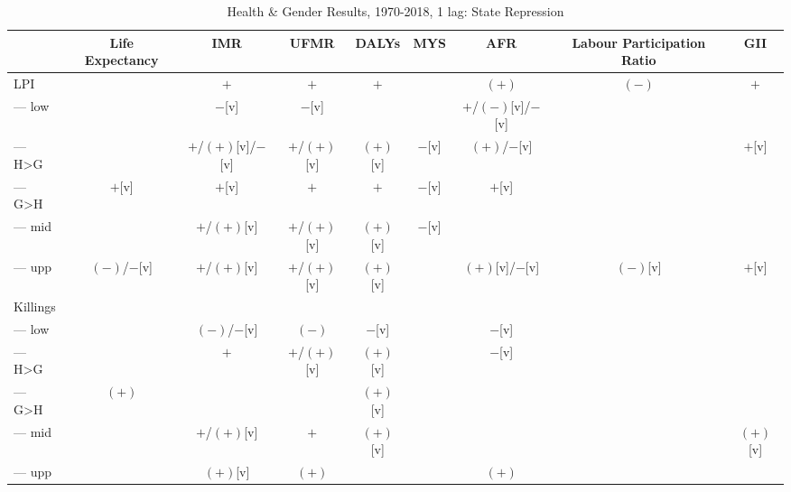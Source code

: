 \documentclass[12pt]{article}
\begin{document}
\begin{table}
\small
\centering
\caption{Health \& Gender Results, 1970-2018, 1 lag: State Repression}
\label{table_summary}
\begin{tabular}{lcccccccc}
\toprule
                          & Life Expectancy     & IMR                 & UFMR         & DALYs           & MYS      & AFR                           & Labour Participation Ratio     & GII \\
\midrule
LPI                       &                     & $+$                 & $+$          & $+$             &          & $(+)$                         & $(-)$                          & $+$ \\
--- low                   &                     & $-$[v]              & $-$[v]       &                 &          & $+$/$(-)$[v]/$-$[v]           &                                & \\
--- H>G                   &                     & $+$/$(+)$[v]/$-$[v] & $+$/$(+)$[v] & $(+)$[v]        & $-$[v]   & $(+)$/$-$[v]                  &                                & $+$[v] \\
--- G>H                   & $+$[v]              & $+$[v]              & $+$          & $+$             & $-$[v]   & $+$[v]                        &                                & \\
--- mid                   &                     & $+$/$(+)$[v]        & $+$/$(+)$[v] & $(+)$[v]        & $-$[v]   &                               &                                & \\
--- upp                   & $(-)$/$-$[v]        & $+$/$(+)$[v]        & $+$/$(+)$[v] & $(+)$[v]        &          & $(+)$[v]/$-$[v]               & $(-)$[v]                       & $+$[v] \\
Killings                  &                     &                     &              &                 &          &                               &                                & \\
--- low                   &                     & $(-)$/$-$[v]        & $(-)$        & $-$[v]          &          & $-$[v]                        &                                & \\
--- H>G                   &                     & $+$                 & $+$/$(+)$[v] & $(+)$[v]        &          & $-$[v]                        &                                & \\
--- G>H                   & $(+)$               &                     &              & $(+)$[v]        &          &                               &                                & \\
--- mid                   &                     & $+$/$(+)$[v]        & $+$          & $(+)$[v]        &          &                               &                                & $(+)$[v] \\
--- upp                   &                     & $(+)$[v]            & $(+)$        &                 &          & $(+)$                         &                                & \\
\bottomrule
\end{tabular}
\end{table}
\end{document}
